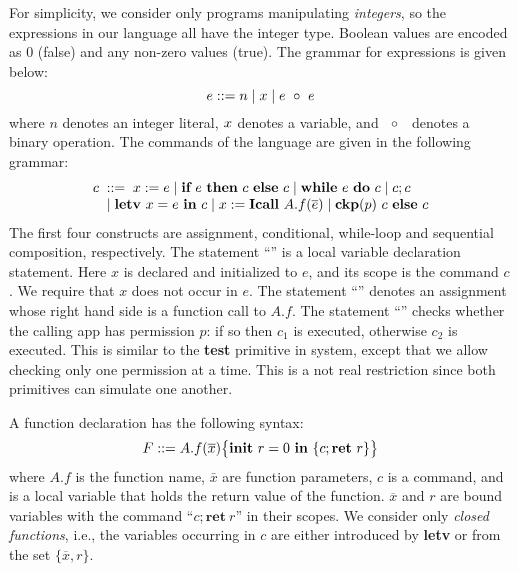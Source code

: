 For simplicity, we consider only programs manipulating \emph{integers}, so the expressions in our language all have the integer type. Boolean values are encoded as 0 (false) and any non-zero values (true). The grammar for expressions is given below:
{\myeqsize\begin{equation*}
e ::= n \mid x \mid {e}~\circ~{e}
\end{equation*}}
where $n$ denotes an integer literal, $x$ denotes a variable, and ${}~\circ~{}$ denotes a binary operation.
The commands of the language are given in the following grammar:
{\myeqsize\begin{equation*}
\begin{array}{l}
  c\;::=\; {x}:={e} \mid {\textbf{if}~{e}~\textbf{then}~{c}~\textbf{else}~{c}} \mid  \textbf{while}~{e}~\textbf{do}~{c} \mid {c};{c}  \\
  \quad \mid {\textbf{letv}~ {x} = {e} ~\textbf{in}~ {c}} \mid {x}:=\textbf{Icall}~{A.f}({\overline{e}}) \mid {\textbf{ckp}({p})~{c} ~\textbf{else}~ {c}}
\end{array}
\end{equation*}}
The first four constructs are assignment, conditional, while-loop and sequential composition, respectively.
The statement ``'' is a local variable declaration statement. Here $x$ is
declared and initialized to $e$, and its scope is the command $c$. We require
that $x$ does not occur in $e.$
The statement ``''  denotes an assignment whose right hand side is
a function call to $A.f$. The statement
``''
checks whether the calling app has permission $p$: if so then $c_1$ is executed,
otherwise $c_2$ is executed.
This is similar to the \textbf{test} primitive in {\BN} system, except that we allow checking only
one permission at a time. This is a not real restriction since both primitives can simulate one another.


A function declaration has the following syntax:
{\myeqsize\begin{equation*}
F ::= {A.f}(\overline{x})\big\{{{\textbf{init}~ {{r}}=0 ~\textbf{in}~\{{c};\textbf{ret}~{{r}}\}}}\big\}
\end{equation*}}
where $A.f$ is the function name, $\bar x$ are function parameters,
$c$ is a command, and {\lpRES} is a local variable
that holds the return value of the function.
$\overline{x}$ and $r$ are bound variables with the command ``$c; \textbf{ret}~r$'' in their scopes.
We consider only {\em closed functions}, i.e., the variables occurring in $c$
are either introduced by \textbf{letv} or from the set $\{\overline{x}, r\}$.



